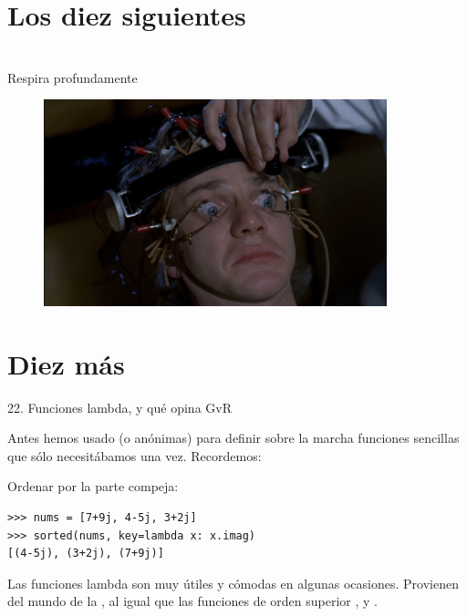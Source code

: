 \documentclass[14pt]{beamer}
\begin{document}
\section{Los diez siguientes}












\section{}

\begin{frame}{}
  \begin{block}{}
    \centering \Large Respira profundamente
  \end{block}

  \begin{figure}
    \centering
    \includegraphics[height=6cm]{pics/a-clockwork-orange-2.jpg}
  \end{figure}
\end{frame}

\section{Diez más}



\begin{frame}[fragile]{22. \large Funciones lambda, y qué opina GvR}
  \small
  \begin{center}
    Antes hemos usado  (o anónimas) para
    definir sobre la marcha funciones sencillas que sólo necesitábamos
    una vez. Recordemos:
  \end{center}

  \footnotesize
  \begin{exampleblock}
    {Ordenar por la parte compeja:}
    \begin{lstlisting}
>>> nums = [7+9j, 4-5j, 3+2j]
>>> sorted(nums, key=lambda x: x.imag)
[(4-5j), (3+2j), (7+9j)]
    \end{lstlisting}
  \end{exampleblock}

  \small
  \begin{block}{}
    \centering
    Las funciones lambda son muy útiles y cómodas en algunas
    ocasiones.  Provienen del mundo de la , al igual que las funciones de orden superior
    ,  y .
  \end{block}
\end{frame}
\end{document}
